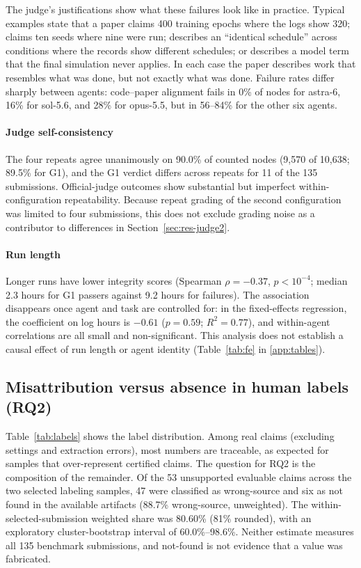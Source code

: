 \documentclass[preprint,12pt,authoryear]{elsarticle}
\begin{document}
The judge's justifications show what these failures look like in practice. Typical examples state that a paper claims 400 training epochs where the logs show 320; claims ten seeds where nine were run; describes an ``identical schedule'' across conditions where the records show different schedules; or describes a model term that the final simulation never applies. In each case the paper describes work that resembles what was done, but not exactly what was done. Failure rates differ sharply between agents: code--paper alignment fails in 0\% of nodes for astra-6, 16\% for sol-5.6, and 28\% for opus-5.5, but in 56--84\% for the other six agents.

\paragraph{Judge self-consistency} The four repeats agree unanimously on 90.0\% of counted nodes (9,570 of 10,638; 89.5\% for G1), and the G1 verdict differs across repeats for 11 of the 135 submissions. Official-judge outcomes show substantial but imperfect within-configuration repeatability. Because repeat grading of the second configuration was limited to four submissions, this does not exclude grading noise as a contributor to differences in Section~\ref{sec:res-judge2}.

\paragraph{Run length} Longer runs have lower integrity scores (Spearman $\rho=-0.37$, $p<10^{-4}$; median 2.3 hours for G1 passers against 9.2 hours for failures). The association disappears once agent and task are controlled for: in the fixed-effects regression, the coefficient on log hours is $-0.61$ ($p=0.59$; $R^2=0.77$), and within-agent correlations are all small and non-significant. This analysis does not establish a causal effect of run length or agent identity (Table~\ref{tab:fe} in \ref{app:tables}).



\subsection{Misattribution versus absence in human labels (RQ2)}\label{sec:res-labels}

Table~\ref{tab:labels} shows the label distribution. Among real claims (excluding settings and extraction errors), most numbers are traceable, as expected for samples that over-represent certified claims. The question for RQ2 is the composition of the remainder. Of the 53 unsupported evaluable claims across the two selected labeling samples, 47 were classified as wrong-source and six as not found in the available artifacts (88.7\% wrong-source, unweighted). The within-selected-submission weighted share was 80.60\% (81\% rounded), with an exploratory cluster-bootstrap interval of 60.0\%--98.6\%. Neither estimate measures all 135 benchmark submissions, and not-found is not evidence that a value was fabricated.
\end{document}
